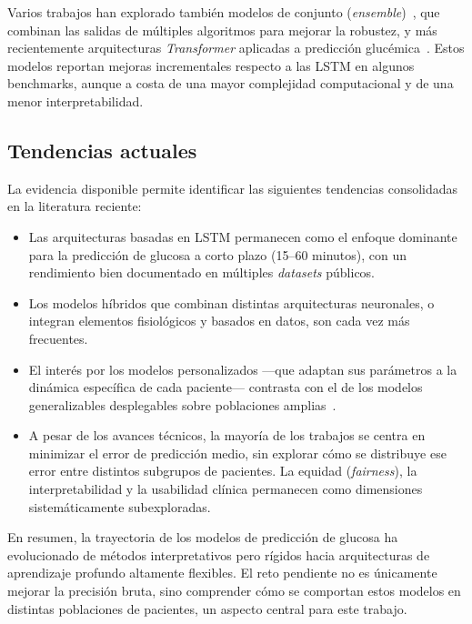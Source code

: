 Varios trabajos han explorado también modelos de conjunto (\emph{ensemble})~\cite{naumova2010multivariable}, que combinan las salidas de múltiples algoritmos para mejorar la robustez, y más recientemente arquitecturas \emph{Transformer} aplicadas a predicción glucémica~\cite{li2023gluctx}. Estos modelos reportan mejoras incrementales respecto a las LSTM en algunos benchmarks, aunque a costa de una mayor complejidad computacional y de una menor interpretabilidad.

\subsection{Tendencias actuales}
\label{subsec:tendencias_prediccion}

La evidencia disponible permite identificar las siguientes tendencias consolidadas en la literatura reciente:

\begin{itemize}
    \item Las arquitecturas basadas en LSTM permanecen como el enfoque dominante para la predicción de glucosa a corto plazo (15--60 minutos), con un rendimiento bien documentado en múltiples \emph{datasets} públicos.
    \item Los modelos híbridos que combinan distintas arquitecturas neuronales, o integran elementos fisiológicos y basados en datos, son cada vez más frecuentes.
    \item El interés por los modelos personalizados —que adaptan sus parámetros a la dinámica específica de cada paciente— contrasta con el de los modelos generalizables desplegables sobre poblaciones amplias~\cite{oviedo2017review}.
    \item A pesar de los avances técnicos, la mayoría de los trabajos se centra en minimizar el error de predicción medio, sin explorar cómo se distribuye ese error entre distintos subgrupos de pacientes. La equidad (\emph{fairness}), la interpretabilidad y la usabilidad clínica permanecen como dimensiones sistemáticamente subexploradas.
\end{itemize}

En resumen, la trayectoria de los modelos de predicción de glucosa ha evolucionado de métodos interpretativos pero rígidos hacia arquitecturas de aprendizaje profundo altamente flexibles. El reto pendiente no es únicamente mejorar la precisión bruta, sino comprender cómo se comportan estos modelos en distintas poblaciones de pacientes, un aspecto central para este trabajo.


